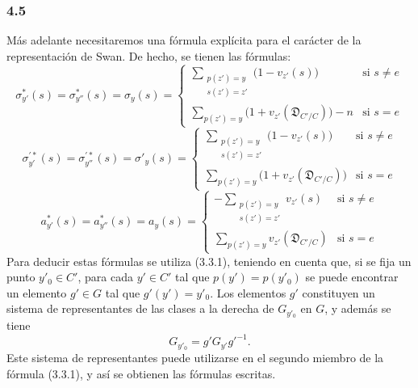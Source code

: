 \subsubsection*{4.5}

Más adelante necesitaremos una fórmula explícita para el carácter de la representación de Swan. De hecho, se tienen las fórmulas:
\[
\sigma^{*}_{y'}(s)=\sigma^{*}_{y''}(s)=\sigma_y(s)=
\begin{cases}
\displaystyle\sum_{\substack{p(z')=y\\s(z')=z'}}\bigl(1-v_{z'}(s)\bigr)& \text{si } s\ne e\\[0.8em]
\displaystyle\sum_{p(z')=y}\bigl(1+v_{z'}(\mathfrak D_{C'/C})\bigr)-n& \text{si } s=e
\end{cases}
\tag{4.5.1}
\]
\[
\sigma^{\prime*}_{y'}(s)=\sigma^{\prime*}_{y''}(s)=\sigma'_y(s)=
\begin{cases}
\displaystyle\sum_{\substack{p(z')=y\\s(z')=z'}}\bigl(1-v_{z'}(s)\bigr)& \text{si } s\ne e\\[0.8em]
\displaystyle\sum_{p(z')=y}\bigl(1+v_{z'}(\mathfrak D_{C'/C})\bigr)& \text{si } s=e
\end{cases}
\tag{4.5.2}
\]
\[
a^{*}_{y'}(s)=a^{*}_{y''}(s)=a_y(s)=
\begin{cases}
\displaystyle-\sum_{\substack{p(z')=y\\s(z')=z'}}v_{z'}(s)& \text{si } s\ne e\\[0.8em]
\displaystyle\sum_{p(z')=y}v_{z'}(\mathfrak D_{C'/C})& \text{si } s=e
\end{cases}
\tag{4.5.3}
\]
Para deducir estas fórmulas se utiliza (3.3.1), teniendo en cuenta que, si se fija un punto $y'_0\in C'$, para cada $y'\in C'$ tal que $p(y')=p(y'_0)$ se puede encontrar un elemento $g'\in G$ tal que $g'(y')=y'_0$. Los elementos $g'$ constituyen un sistema de representantes de las clases a la derecha de $G_{y'_0}$ en $G$, y además se tiene
\[
G_{y'_0}=g'G_{y'}g'^{-1}.
\]
Este sistema de representantes puede utilizarse en el segundo miembro de la fórmula (3.3.1), y así se obtienen las fórmulas escritas.
